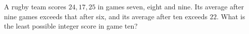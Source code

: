 A rugby team scores $24,17,25$ in games seven, eight and nine. Its average after nine games exceeds that after six, and its average after ten exceeds $22$. What is the least possible integer score in game ten?
